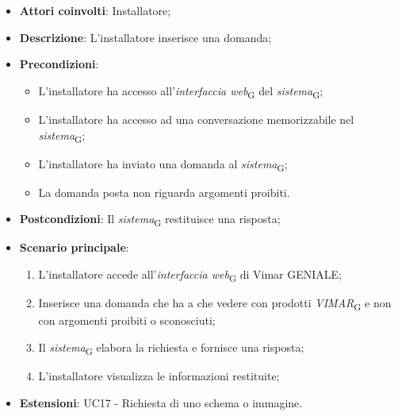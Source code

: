 \begin{itemize}
    \item \textbf{Attori coinvolti}: Installatore;
    \item \textbf{Descrizione}: L’installatore inserisce una domanda;
    \item \textbf{Precondizioni}: 
        \begin{itemize}
            \item L’installatore ha accesso all’\textit{interfaccia web}\textsubscript{G} del \textit{sistema}\textsubscript{G};
            \item L’installatore ha accesso ad una conversazione memorizzabile nel \textit{sistema}\textsubscript{G};
            \item L'installatore ha inviato una domanda al \textit{sistema}\textsubscript{G};
            \item La domanda posta non riguarda argomenti proibiti.
        \end{itemize}
    \item \textbf{Postcondizioni}: Il \textit{sistema}\textsubscript{G} restituisce una risposta;
    \item \textbf{Scenario principale}:
    \begin{enumerate}
    \item L’installatore accede all’\textit{interfaccia web}\textsubscript{G} di Vimar GENIALE;
    \item Inserisce una domanda che ha a che vedere con prodotti \textit{VIMAR}\textsubscript{G} e non con argomenti proibiti o sconosciuti;
    \item Il \textit{sistema}\textsubscript{G} elabora la richiesta e fornisce una risposta;
    \item L’installatore visualizza le informazioni restituite;
    \end{enumerate}
    \item \textbf{Estensioni}: UC17 - Richiesta di uno schema o immagine.
\end{itemize}
